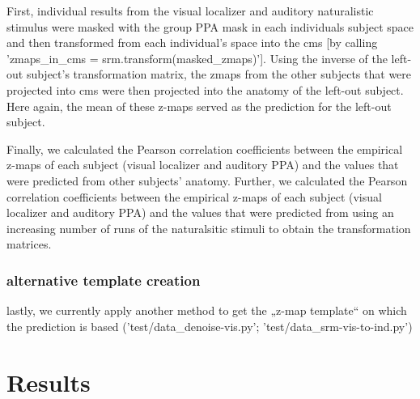 First, individual results from the visual localizer and auditory naturalistic
stimulus were masked with the group PPA mask in each individuals subject space
and then transformed from each individual's space into the \ac{cms} [by calling
'zmaps\_in\_cms = srm.transform(masked\_zmaps)'].
Using the inverse of the left-out subject's transformation matrix, the zmaps
from the other subjects that were projected into \ac{cms} were then projected
into the anatomy of the left-out subject.
%
Here again, the mean of these z-maps served as the prediction for the left-out
subject.


Finally, we calculated the Pearson correlation coefficients between the
empirical z-maps of each subject (visual localizer and auditory PPA) and the
values that were predicted from other subjects' anatomy.
%
Further, we calculated the Pearson correlation coefficients between the
empirical z-maps of each subject (visual localizer and auditory PPA) and the
values that were predicted from using an increasing number of runs of the
naturalsitic stimuli to obtain the transformation matrices.


\subsubsection{alternative template creation}
%
lastly, we currently apply another method to get the „z-map template“ on which
the prediction is based ('test/data\_denoise-vis.py';
'test/data\_srm-vis-to-ind.py')


\section{Results}

